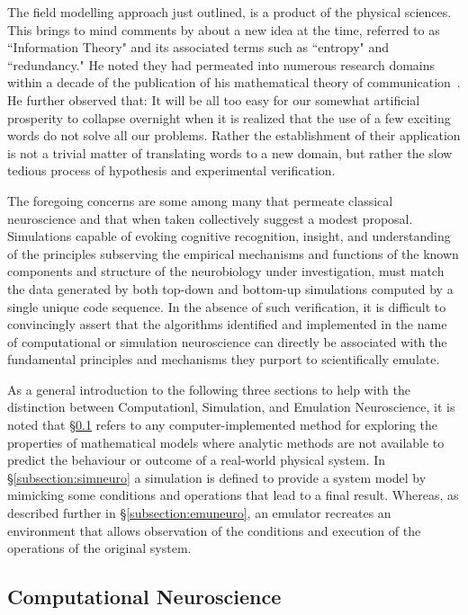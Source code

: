 \documentclass[11pt,3p,twocolumn]{JMN}
\begin{document}
The field modelling approach just outlined, is a product of the physical sciences. This brings to mind comments by \citet{shannon56} about a new idea at the time, referred to as ``Information Theory" and its associated terms such as ``entropy" and ``redundancy." He noted they had permeated into numerous research domains within a decade of the publication of his mathematical theory of communication~\citep{shannon48}. He further observed that: It will be all too easy for our somewhat artificial prosperity to collapse overnight when it is realized that the use of a few exciting words do not solve all our problems. Rather the establishment of their application is not a trivial matter of translating words to a new domain, but rather the slow tedious process of hypothesis and experimental verification.

The foregoing concerns are some among many that permeate classical neuroscience and that when taken collectively suggest a modest proposal. Simulations capable of evoking cognitive recognition, insight, and understanding of the principles subserving the empirical mechanisms and functions of the known components and structure of the neurobiology under investigation, must match the data generated by both top-down and bottom-up simulations computed by a single unique code sequence. In the absence of such verification, it is difficult to convincingly assert that the algorithms identified and implemented in the name of computational or simulation neuroscience can directly be associated with the fundamental principles and mechanisms they purport to scientifically emulate.

As a general introduction to the following three sections to help with the distinction between Computationl, Simulation, and Emulation Neuroscience, it is noted that \S\ref{subsection:compneuro} refers to any computer-implemented method for exploring the properties of mathematical models where analytic methods are not available to predict the behaviour or outcome of a real-world physical system. In \S\ref{subsection:simneuro} a simulation is defined to provide a system model by mimicking some conditions and operations that lead to a final result. Whereas, as described further in \S\ref{subsection:emuneuro}, an emulator recreates an environment that allows observation of the conditions and execution of the operations of the original system.

\subsection{Computational Neuroscience}
\label{subsection:compneuro}
\end{document}

